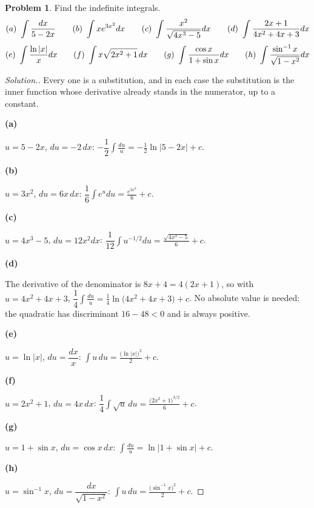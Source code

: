 \documentclass[11pt,a4paper]{article}
\theoremstyle{definition}
\newtheorem{problemx}{Problem}[subsection]
\newenvironment{problem}{\begin{problemx}}{\end{problemx}}
\newenvironment{solution}
  {\renewcommand{\qedsymbol}{}\begin{proof}[\textit{Solution}.]}
  {\end{proof}}
\newcommand{\subhead}[1]{%
  \par\medskip\noindent\textbf{#1}\par\nobreak\smallskip}
\begin{document}
\begin{problem}
Find the indefinite integrals.
$$(a)\ \int\frac{dx}{5-2x}\hspace{0.7cm}
(b)\ \int xe^{3x^2}dx\hspace{0.7cm}
(c)\ \int\frac{x^2}{\sqrt{4x^3-5}}dx\hspace{0.7cm}
(d)\ \int\frac{2x+1}{4x^2+4x+3}dx$$
$$(e)\ \int\frac{\ln\left|x\right|}{x}dx\hspace{0.7cm}
(f)\ \int x\sqrt{2x^2+1}\,dx\hspace{0.7cm}
(g)\ \int\frac{\cos x}{1+\sin x}dx\hspace{0.7cm}
(h)\ \int\frac{\sin^{-1}x}{\sqrt{1-x^2}}dx$$
\end{problem}
\begin{solution}
Every one is a substitution, and in each case the substitution is the inner
function whose derivative already stands in the numerator, up to a constant.

\subhead{(a)} $u = 5-2x$, $du = -2\,dx$:
$-\dfrac12\displaystyle\int\frac{du}{u} = -\frac12\ln\left|5-2x\right| + c$.

\subhead{(b)} $u = 3x^2$, $du = 6x\,dx$:
$\dfrac16\displaystyle\int e^u du = \frac{e^{3x^2}}{6} + c$.

\subhead{(c)} $u = 4x^3-5$, $du = 12x^2dx$:
$\dfrac{1}{12}\displaystyle\int u^{-1/2}du = \frac{\sqrt{4x^3-5}}{6} + c$.

\subhead{(d)} The derivative of the denominator is $8x+4 = 4(2x+1)$, so with
$u = 4x^2+4x+3$,
$\dfrac14\displaystyle\int\frac{du}{u} = \frac14\ln\big(4x^2+4x+3\big) + c$.
No absolute value is needed: the quadratic has discriminant $16-48<0$ and is
always positive.

\subhead{(e)} $u = \ln\left|x\right|$, $du = \dfrac{dx}{x}$:
$\displaystyle\int u\,du = \frac{\big(\ln\left|x\right|\big)^2}{2} + c$.

\subhead{(f)} $u = 2x^2+1$, $du = 4x\,dx$:
$\dfrac14\displaystyle\int\sqrt u\,du = \frac{\big(2x^2+1\big)^{3/2}}{6} + c$.

\subhead{(g)} $u = 1+\sin x$, $du = \cos x\,dx$:
$\displaystyle\int\frac{du}{u} = \ln\left|1+\sin x\right| + c$.

\subhead{(h)} $u = \sin^{-1}x$, $du = \dfrac{dx}{\sqrt{1-x^2}}$:
$\displaystyle\int u\,du = \frac{\big(\sin^{-1}x\big)^2}{2} + c$.
\end{solution}
\end{document}
